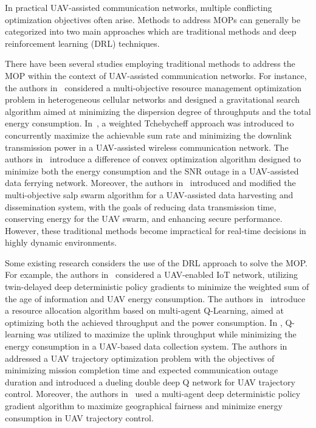 \documentclass[10pt,journal,compsoc]{IEEEtran}
\begin{document}
\par In practical UAV-assisted communication networks, multiple conflicting optimization objectives often arise. Methods to address MOPs can generally be categorized into two main approaches which are traditional methods and deep reinforcement learning (DRL) techniques.

\par There have been several studies employing traditional methods to address the MOP within the context of UAV-assisted communication networks. For instance, the authors in~\cite{Liu2021resource} considered a multi-objective resource management optimization problem in heterogeneous cellular networks and designed a gravitational search algorithm aimed at minimizing the dispersion degree of throughputs and the total energy consumption. In~\cite{Muhammad2021performance}, a weighted Tchebycheff approach was introduced to concurrently maximize the achievable sum rate and minimizing the downlink transmission power in a UAV-assisted wireless communication network. The authors in~\cite{Shafique2020end-to-end} introduce a difference of convex optimization algorithm designed to minimize both the energy consumption and the SNR outage in a UAV-assisted data ferrying network. Moreover, the authors in~\cite{Li2023multi-objective} introduced and modified the multi-objective salp swarm algorithm for a UAV-assisted data harvesting and dissemination system, with the goals of reducing data transmission time, conserving energy for the UAV swarm, and enhancing secure performance. However, these traditional methods become impractical for real-time decisions in highly dynamic environments.

\par Some existing research considers the use of the DRL approach to solve the MOP. For example, the authors in~\cite{Sun2021aoi-energy-aware} considered a UAV-enabled IoT network, utilizing twin-delayed deep deterministic policy gradients to minimize the weighted sum of the age of information and UAV energy consumption. The authors in~\cite{Cui2020multi-agent} introduce a resource allocation algorithm based on multi-agent Q-Learning, aimed at optimizing both the achieved throughput and the power consumption. In \cite{Fu2021energy-efficient}, Q-learning was utilized to maximize the uplink throughput while minimizing the energy consumption in a UAV-based data collection system. The authors in~\cite{Zeng2021simultaneous} addressed a UAV trajectory optimization problem with the objectives of minimizing mission completion time and expected communication outage duration and introduced a dueling double deep Q network for UAV trajectory control. Moreover, the authors in~\cite{Zhao2022multi-agent} used a multi-agent deep deterministic policy gradient algorithm to maximize geographical fairness and minimize energy consumption in UAV trajectory control. 
\end{document}

